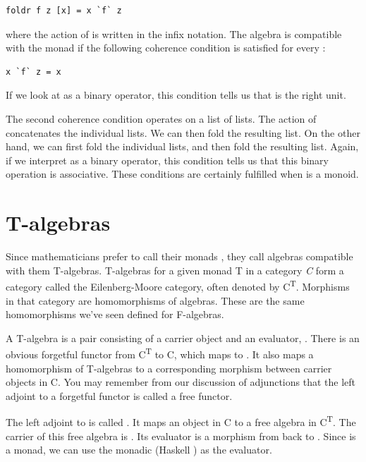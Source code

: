 \begin{verbatim}
foldr f z [x] = x `f` z
\end{verbatim}
where the action of  is written in the infix notation. The
algebra is compatible with the monad if the following coherence
condition is satisfied for every :

\begin{verbatim}
x `f` z = x
\end{verbatim}
If we look at  as a binary operator, this condition tells us
that  is the right unit.

The second coherence condition operates on a list of lists. The action
of  concatenates the individual lists. We can then fold the
resulting list. On the other hand, we can first fold the individual
lists, and then fold the resulting list. Again, if we interpret
 as a binary operator, this condition tells us that this
binary operation is associative. These conditions are certainly
fulfilled when  is a monoid.

\section{T-algebras}\label{t-algebras}

Since mathematicians prefer to call their monads , they call
algebras compatible with them T-algebras. T-algebras for a given monad T
in a category \emph{C} form a category called the Eilenberg-Moore
category, often denoted by C\textsuperscript{T}. Morphisms in that
category are homomorphisms of algebras. These are the same homomorphisms
we've seen defined for F-algebras.

A T-algebra is a pair consisting of a carrier object and an evaluator,
. There is an obvious forgetful functor  from
C\textsuperscript{T} to C, which maps  to . It
also maps a homomorphism of T-algebras to a corresponding morphism
between carrier objects in C. You may remember from our discussion of
adjunctions that the left adjoint to a forgetful functor is called a
free functor.

The left adjoint to  is called . It maps an object
 in C to a free algebra in C\textsuperscript{T}. The carrier
of this free algebra is . Its evaluator is a morphism from
 back to . Since  is a monad,
we can use the monadic  (Haskell ) as the
evaluator.

